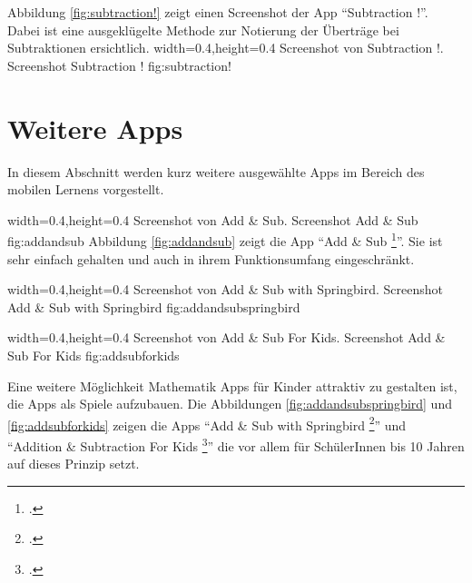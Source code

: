 Abbildung \ref{fig:subtraction!} zeigt einen Screenshot der App \enquote{Subtraction !}. Dabei ist 
eine ausgeklügelte Methode zur Notierung der Überträge bei Subtraktionen ersichtlich.
  {width=0.4\textwidth,height=0.4\textheight}%
  {Screenshot von Subtraction !.}%
  {Screenshot Subtraction !}%
  {fig:subtraction!}%


\section{Weitere Apps}

In diesem Abschnitt werden kurz weitere ausgewählte Apps im Bereich des mobilen Lernens vorgestellt.

  {width=0.4\textwidth,height=0.4\textheight}%
  {Screenshot von Add \& Sub.}%
  {Screenshot Add \& Sub}%
  {fig:addandsub}%
Abbildung \ref{fig:addandsub} zeigt die App \enquote{Add \& Sub \footcite{https://itunes.apple.com/de/app/add-sub/id693077439?mt=8}}. Sie ist sehr einfach gehalten und auch 
in ihrem Funktionsumfang eingeschränkt.

  {width=0.4\textwidth,height=0.4\textheight}%
  {Screenshot von Add \& Sub with Springbird.}%
  {Screenshot Add \& Sub with Springbird}%
  {fig:addandsubspringbird}%

  {width=0.4\textwidth,height=0.4\textheight}%
  {Screenshot von Add \& Sub For Kids.}%
  {Screenshot Add \& Sub For Kids}%
  {fig:addsubforkids}%

Eine weitere Möglichkeit Mathematik Apps für Kinder attraktiv zu gestalten ist, die Apps als Spiele
aufzubauen. Die Abbildungen \ref{fig:addandsubspringbird} und \ref{fig:addsubforkids} zeigen die Apps
\enquote{Add \& Sub with Springbird \footcite{https://itunes.apple.com/de/app/add-subtract-springbird-mathe/id601505771?mt=8}}
und
\enquote{Addition \& Subtraction For Kids \footcite{https://itunes.apple.com/de/app/addition-subtraction-for-kids/id426907035?mt=8}}
die vor allem für SchülerInnen bis 10 Jahren auf dieses Prinzip setzt.


